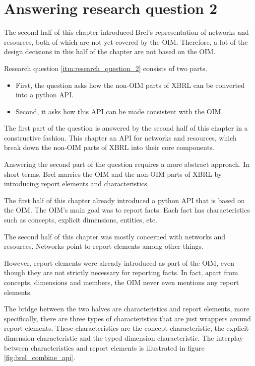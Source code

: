 \section{Answering research question 2}
\label{sec:answer_research_question_2}

The second half of this chapter introduced Brel's representation of networks and resources, 
both of which are not yet covered by the OIM.
Therefore, a lot of the design decisions in this half of the chapter are not based on the OIM.

Research question \ref{itm:research_question_2} consists of two parts.

\begin{itemize}
    \item First, the question asks how the non-OIM parts of XBRL can be converted into a python API.
    \item Second, it asks how this API can be made consistent with the OIM.
\end{itemize}

The first part of the question is answered by the second half of this chapter in a constructive fashion.
This chapter an API for networks and resources, which break down the non-OIM parts of XBRL into their core components.

Answering the second part of the question requires a more abstract approach. 
In short terms, Brel marries the OIM and the non-OIM parts of XBRL by introducing report elements and characteristics.

The first half of this chapter already introduced a python API that is based on the OIM.
The OIM's main goal was to report facts.
Each fact has characteristics such as concepts, explicit dimensions, entities, etc.

The second half of this chapter was mostly concerned with networks and resources.
Networks point to report elements among other things.

However, report elements were already introduced as part of the OIM, 
even though they are not strictly necessary for reporting facts.
In fact, apart from concepts, dimensions and members, the OIM never even mentions any report elements.

The bridge between the two halves are characteristics and report elements, more specifically, 
there are three types of characteristics that are just wrappers around report elements.
These characteristics are the concept characteristic, the explicit dimension characteristic and the typed dimension characteristic.
The interplay between characteristics and report elements is illustrated in figure \ref{fig:brel_combine_api}.

